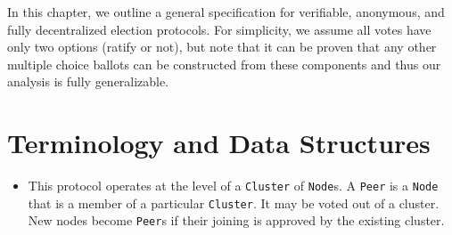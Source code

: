 In this chapter, we outline a general specification for verifiable, anonymous,
and fully decentralized election protocols. For simplicity, we assume all votes
have only two options (ratify or not), but note that it can be proven that any
other multiple choice ballots can be constructed from these components and thus
our analysis is fully generalizable.
\section{Terminology and Data Structures}
\begin{itemize}
  \item This protocol operates at the level of a \texttt{Cluster} of
    \texttt{Node}s.  A \texttt{Peer} is a \texttt{Node} that is a member of a
    particular \texttt{Cluster}. It may be voted out of a cluster. New nodes
    become \texttt{Peer}s if their joining is approved by the existing cluster.


\end{itemize}

